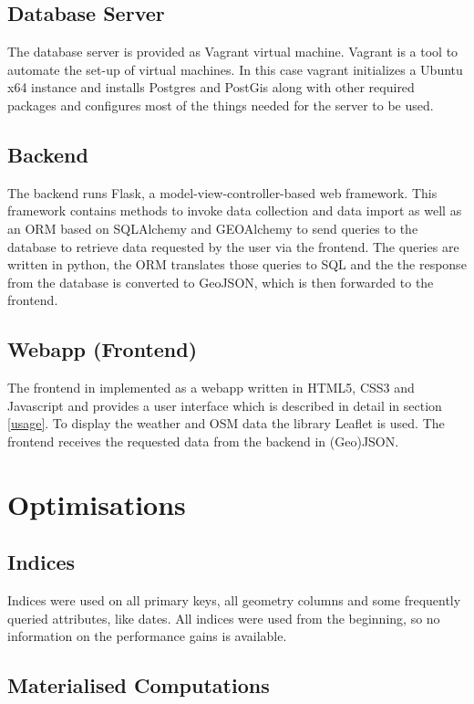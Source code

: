 \documentclass[paper=a4, fontsize=11pt]{article} %
\numberwithin{equation}{section} %
\numberwithin{figure}{section} %
\numberwithin{table}{section} %
\begin{document}
\subsection{Database Server}
The database server is provided as Vagrant virtual machine. Vagrant is a tool to automate the set-up of virtual machines. In this case vagrant initializes a Ubuntu x64 instance and installs Postgres and PostGis along with other required packages and configures most of the things needed for the server to be used.
\subsection{Backend}
The backend runs Flask, a model-view-controller-based web framework. This framework contains methods to invoke data collection and data import as well as an ORM based on SQLAlchemy and GEOAlchemy to send queries to the database to retrieve data requested by the user via the frontend. The queries are written in python, the ORM translates those queries to SQL and the the response from the database is converted to GeoJSON, which is then forwarded to the frontend.
\subsection{Webapp (Frontend)}\label{subsec:webapp}
The frontend in implemented as a webapp written in HTML5, CSS3 and Javascript and provides a user interface which is described in detail in section \ref{usage}. To display the weather and OSM data the library Leaflet is used. The frontend receives the requested data from the backend in (Geo)JSON.

\section{Optimisations}

\subsection{Indices}

Indices were used on all primary keys, all geometry columns and some frequently queried attributes, like dates. All indices were used from the beginning, so no information on the performance gains is available.

\subsection{Materialised Computations}\label{subsec:opticontrib}
\end{document}
